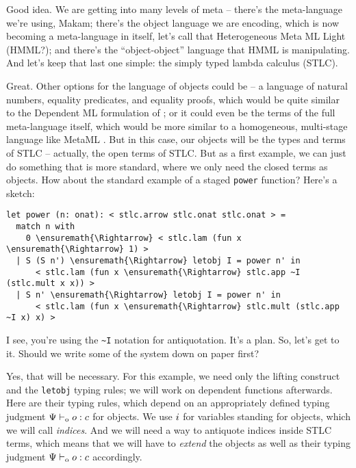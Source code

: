 \heroADVISOR{} Good idea. We are getting into many levels of meta -- there's
the meta-language we're using, Makam; there's the object language we are
encoding, which is now becoming a meta-language in itself, let's call
that Heterogeneous Meta ML Light (HMML?); and there's the
``object-object'' language that HMML is manipulating. And let's keep
that last one simple: the simply typed lambda calculus (STLC).

\heroSTUDENT{} Great. Other options for the language of objects could be -- a
language of natural numbers, equality predicates, and equality proofs,
which would be quite similar to the Dependent ML formulation of
\citet{licata2005formulation}; or it could even be the terms of the full
meta-language itself, which would be more similar to a homogeneous,
multi-stage language like MetaML \citep{metaml-main-reference}. But in
this case, our objects will be the types and terms of STLC -- actually,
the open terms of STLC. But as a first example, we can just do something
that is more standard, where we only need the closed terms as objects.
How about the standard example of a staged \texttt{power} function?
Here's a sketch:

\begin{verbatim}
let power (n: onat): < stlc.arrow stlc.onat stlc.onat > =
  match n with
    0 \ensuremath{\Rightarrow} < stlc.lam (fun x \ensuremath{\Rightarrow} 1) >
  | S (S n') \ensuremath{\Rightarrow} letobj I = power n' in
      < stlc.lam (fun x \ensuremath{\Rightarrow} stlc.app ~I (stlc.mult x x)) >
  | S n' \ensuremath{\Rightarrow} letobj I = power n' in
      < stlc.lam (fun x \ensuremath{\Rightarrow} stlc.mult (stlc.app ~I x) x) >
\end{verbatim}

\heroADVISOR{} I see, you're using the \texttt{\textasciitilde{}I} notation
for antiquotation. It's a plan. So, let's get to it. Should we write
some of the system down on paper first?

\heroSTUDENT{} Yes, that will be necessary. For this example, we need only the
lifting construct and the \texttt{letobj} typing rules; we will work on
dependent functions afterwards. Here are their typing rules, which
depend on an appropriately defined typing judgment \(\Psi \vdash_{\text{o}} o : c\)
for objects. We use \(i\) for variables standing for objects,
which we will call \emph{indices}. And we will need a way to antiquote
indices inside STLC terms, which means that we will have to
\emph{extend} the objects as well as their typing judgment
\(\Psi \vdash_{\text{o}} o : c\) accordingly.

